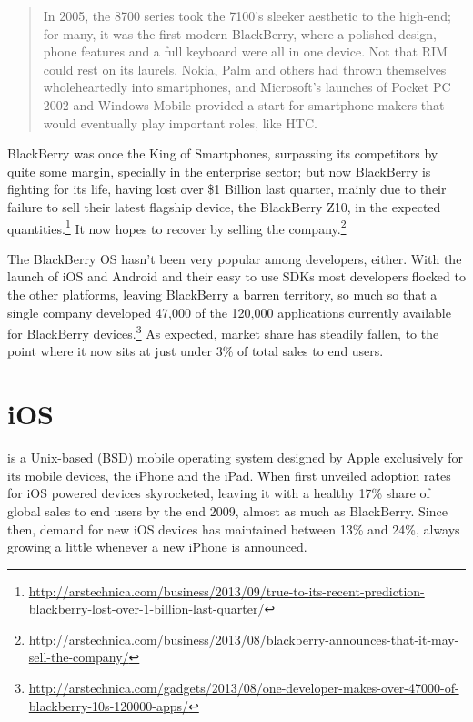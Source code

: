 \begin{quotation}
In 2005, the 8700 series took the 7100's sleeker aesthetic to the high-end; for many, it was the first modern BlackBerry, where a polished design, phone features and a full keyboard were all in one device. Not that RIM could rest on its laurels. Nokia, Palm and others had thrown themselves wholeheartedly into smartphones, and Microsoft's launches of Pocket PC 2002 and Windows Mobile provided a start for smartphone makers that would eventually play important roles, like HTC.
\cite{fingas:2013}
\end{quotation}


BlackBerry was once the King of Smartphones, surpassing its competitors by quite some margin, specially in the enterprise sector; but now BlackBerry is fighting for its life, having lost over \$1 Billion last quarter, mainly due to their failure to sell their latest flagship device, the BlackBerry Z10, in the expected quantities.\footnote{\url{http://arstechnica.com/business/2013/09/true-to-its-recent-prediction-blackberry-lost-over-1-billion-last-quarter/}} It now hopes to recover by selling the company.\footnote{\url{http://arstechnica.com/business/2013/08/blackberry-announces-that-it-may-sell-the-company/}}


The BlackBerry OS hasn't been very popular among developers, either. With the launch of iOS and Android and their easy to use SDKs most developers flocked to the other platforms, leaving BlackBerry a barren territory, so much so that a single company developed 47,000 of the 120,000 applications currently available for BlackBerry devices.\footnote{\url{http://arstechnica.com/gadgets/2013/08/one-developer-makes-over-47000-of-blackberry-10s-120000-apps/}} As expected, market share has steadily fallen, to the point where it now sits at just under 3\% of total sales to end users.
  

\section{iOS}
 is a Unix-based (BSD) mobile operating system designed by Apple exclusively for its mobile devices, the iPhone\textregistered{} and the iPad\textregistered. When first unveiled adoption rates for iOS powered devices skyrocketed, leaving it with a healthy 17\% share of global sales to end users by the end 2009, almost as much as BlackBerry. Since then, demand for new iOS devices has maintained between 13\% and 24\%, always growing a little whenever a new iPhone is announced.

